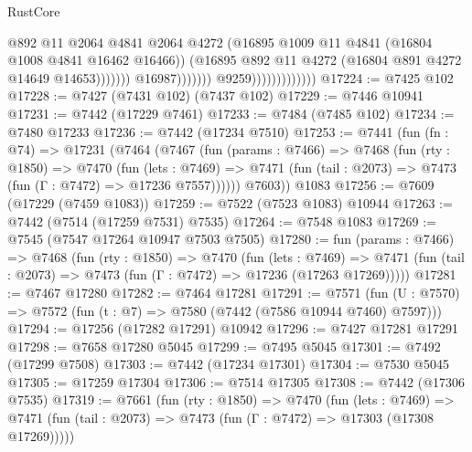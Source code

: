 \begin{lexlean}{RustCore}
\begin{coremodule}
                                                      @892
                                                      @11
                                                      @2064
                                                      @4841
                                                      @2064
                                                      @4272
                                                      (@16895
                                                        @1009
                                                        @11
                                                        @4841
                                                        (@16804 @1008 @4841 @16462 @16466))
                                                      (@16895
                                                        @892
                                                        @11
                                                        @4272
                                                        (@16804 @891 @4272 @14649 @14653)))))))
                                            @16987)))))))
                              @9259)))))))))))))
@17224 := @7425 @102
@17228 := @7427 (@7431 @102) (@7437 @102)
@17229 := @7446 @10941
@17231 := @7442 (@17229 @7461)
@17233 := @7484 (@7485 @102)
@17234 := @7480 @17233
@17236 := @7442 (@17234 @7510)
@17253 := @7441
    (fun (fn : @74) =>
    @17231
      (@7464
        (@7467
          (fun (params : @7466) =>
          @7468
            (fun (rty : @1850) =>
            @7470
              (fun (lets : @7469) =>
              @7471 (fun (tail : @2073) => @7473 (fun (Γ : @7472) => @17236 @7557))))))
        @7603))
    @1083
@17256 := @7609 (@17229 (@7459 @1083))
@17259 := @7522 (@7523 @1083) @10944
@17263 := @7442 (@7514 (@17259 @7531) @7535)
@17264 := @7548 @1083
@17269 := @7545 (@7547 @17264 @10947 @7503 @7505)
@17280 := fun (params : @7466) =>
  @7468
    (fun (rty : @1850) =>
    @7470
      (fun (lets : @7469) =>
      @7471 (fun (tail : @2073) => @7473 (fun (Γ : @7472) => @17236 (@17263 @17269)))))
@17281 := @7467 @17280
@17282 := @7464 @17281
@17291 := @7571
    (fun (U : @7570) => @7572 (fun (t : @7) => @7580 (@7442 (@7586 @10944 @7460) @7597)))
@17294 := @17256 (@17282 @17291) @10942
@17296 := @7427 @17281 @17291
@17298 := @7658 @17280 @5045
@17299 := @7495 @5045
@17301 := @7492 (@17299 @7508)
@17303 := @7442 (@17234 @17301)
@17304 := @7530 @5045
@17305 := @17259 @17304
@17306 := @7514 @17305
@17308 := @7442 (@17306 @7535)
@17319 := @7661
    (fun (rty : @1850) =>
    @7470
      (fun (lets : @7469) =>
      @7471 (fun (tail : @2073) => @7473 (fun (Γ : @7472) => @17303 (@17308 @17269)))))

\end{coremodule}
\end{lexlean}
